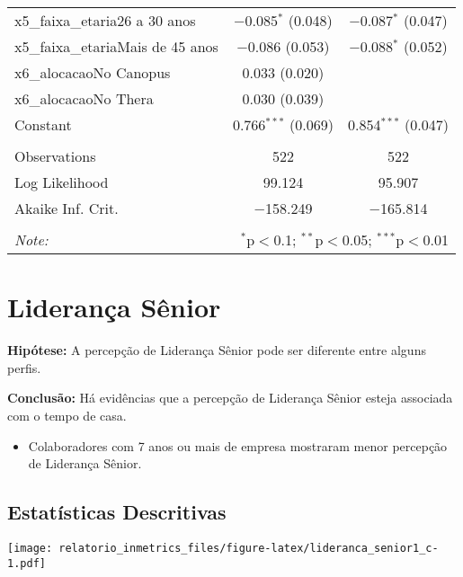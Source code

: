\documentclass[]{book}
\providecommand{\tightlist}{%
  \setlength{\itemsep}{0pt}\setlength{\parskip}{0pt}}
\begin{document}
\begin{table}[!htbp]
\begin{tabular}{@{\extracolsep{5pt}}lcc}
  x5\_faixa\_etaria26 a 30 anos & $-$0.085$^{*}$ (0.048) & $-$0.087$^{*}$ (0.047) \\ 
  x5\_faixa\_etariaMais de 45 anos & $-$0.086 (0.053) & $-$0.088$^{*}$ (0.052) \\ 
  x6\_alocacaoNo Canopus & 0.033 (0.020) &  \\ 
  x6\_alocacaoNo Thera & 0.030 (0.039) &  \\ 
  Constant & 0.766$^{***}$ (0.069) & 0.854$^{***}$ (0.047) \\ 
 \hline \\[-1.8ex] 
Observations & 522 & 522 \\ 
Log Likelihood & 99.124 & 95.907 \\ 
Akaike Inf. Crit. & $-$158.249 & $-$165.814 \\ 
\hline 
\hline \\[-1.8ex] 
\textit{Note:}  & \multicolumn{2}{r}{$^{*}$p$<$0.1; $^{**}$p$<$0.05; $^{***}$p$<$0.01} \\ 
\end{tabular} 
\end{table}

\pagebreak

\hypertarget{lideranca-senior-1}{%
\section{Liderança Sênior}\label{lideranca-senior-1}}

\textbf{Hipótese:} A percepção de Liderança Sênior pode ser diferente entre alguns perfis.

\textbf{Conclusão:} Há evidências que a percepção de Liderança Sênior esteja associada com o tempo de casa.

\begin{itemize}
\tightlist
\item
  Colaboradores com 7 anos ou mais de empresa mostraram menor percepção de Liderança Sênior.
\end{itemize}

\hypertarget{estatisticas-descritivas-12}{%
\subsection{Estatísticas Descritivas}\label{estatisticas-descritivas-12}}

\texttt{[image: relatorio\_inmetrics\_files/figure-latex/lideranca\_senior1\_c-1.pdf]}
\end{document}
